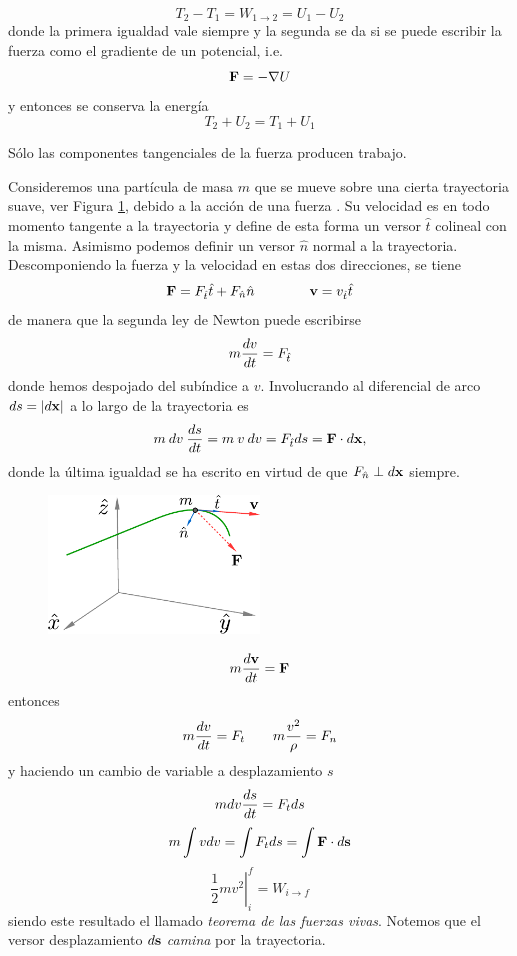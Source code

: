 \documentclass[10pt,oneside]{CBFT_book}
\begin{document}
\[
	T_2 - T_1 = W_{1 \to 2} = U_1 - U_2 
\]
donde la primera igualdad vale siempre y la segunda se da si se puede escribir la fuerza como el
gradiente de un potencial, i.e.
\[
	\vb{F} = - \nabla U
\]
y entonces se conserva la energía
\[
	T_2 + U_2 = T_1 + U_1
\]

Sólo las componentes tangenciales de la fuerza producen trabajo.

Consideremos una partícula de masa $ m $ que se mueve sobre una cierta trayectoria suave, ver {Figura} 
\ref{fig_mc_workenergy}, debido a la acción de una fuerza .
Su velocidad  es en todo momento tangente a la trayectoria y define de esta forma un versor $ \hat{t} $
colineal con la misma. Asimismo podemos definir un versor $ \hat{n} $ normal a la trayectoria.
Descomponiendo la fuerza y la velocidad en estas dos direcciones, se tiene 
\[
	\vb{F} = F_{\hat{t}} \hat{t}  + F_{\hat{n}} \hat{n} \qquad \qquad \vb{v} = v_{\hat{t}} \hat{t}
\]
de manera que la segunda ley de Newton puede escribirse
\[
	m \frac{d^{\hspace{-0.05em}} {v}}{d {t}^{\hspace{-0.05em}}} = F_{\hat{t}}
\]
donde hemos despojado del subíndice a $v$. Involucrando al diferencial de arco $ ds = | d\vb{x} | $ a lo largo de la 
trayectoria es
\[
	m \: dv \:\dtot{s}{t} = m \: v \: dv = F_{\hat{t}} ds = \vb{F} \cdot d\vb{x},
\]
donde la última igualdad se ha escrito en virtud de que $ F_{\hat{n}} \perp d\vb{x} $ siempre.


\begin{figure}[hbt]
	\begin{center}
	\includegraphics[width=0.5\textwidth]{images/fig_mc_workenergy.pdf}	
	\end{center}
	\caption{}
	\label{fig_mc_workenergy}
\end{figure} 

\[
	m \dtot{\vb{v}}{t} = \vb{F}
\]
entonces
\[
	m \frac{d^{\hspace{-0.05em}} {v}}{d {t}^{\hspace{-0.05em}}} = F_t \qquad m \frac{v^2}{\rho} = F_n
\]
y haciendo un cambio de variable a desplazamiento $s$
\[
	m dv \frac{d^{\hspace{-0.05em}} {s}}{d {t}^{\hspace{-0.05em}}} = F_t ds
\]
\[
	m \int v dv = \int F_t ds = \int \vb{F} \cdot d\vb{s}
\]
\[
	\left. \frac{1}{2} m v^2 \right|_i^f = W_{i \to f}
\]
siendo este resultado el llamado {\it teorema de las fuerzas vivas}. 
Notemos que el versor desplazamiento $d\vb{s}$ {\it camina} por la trayectoria.
\end{document}
